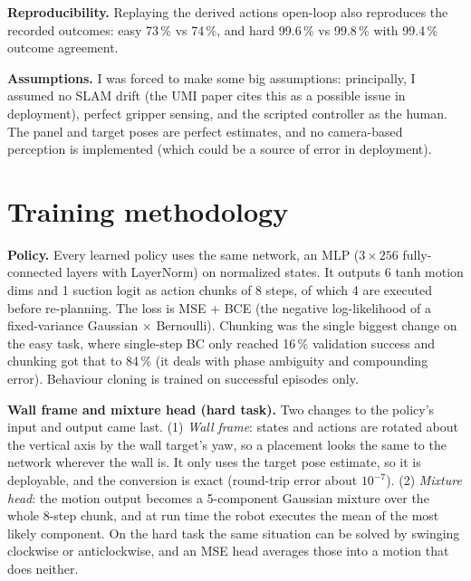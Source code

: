 \documentclass[10pt]{article}
\newcommand{\pct}{\,\%}
\newcommand{\para}[1]{\textbf{#1}}
\begin{document}
\para{Reproducibility.} Replaying the derived actions open-loop also reproduces the recorded outcomes: easy 73\pct{} vs 74\pct, and
hard 99.6\pct{} vs 99.8\pct{} with 99.4\pct{} outcome agreement.

\para{Assumptions.} I was forced to make some big assumptions: principally, I assumed no SLAM drift (the UMI paper cites this as a possible issue in deployment), perfect gripper sensing, and the scripted controller as the
human. The panel and target poses are perfect estimates, and no camera-based perception is implemented (which could be a source of error in deployment).

\section{Training methodology}

\para{Policy.} Every learned policy uses the same network, an MLP ($3 \times 256$ fully-connected layers with LayerNorm) on
normalized states. It outputs 6 tanh motion dims and 1 suction logit as action chunks of 8 steps, of
which 4 are executed before re-planning. The loss is MSE + BCE (the negative log-likelihood of a
fixed-variance Gaussian $\times$ Bernoulli). Chunking was the single biggest change on the easy task, where
single-step BC only reached 16\pct{} validation success and chunking got that to 84\pct{} (it deals with phase
ambiguity and compounding error). Behaviour cloning is trained on successful episodes only.

\para{Wall frame and mixture head (hard task).} Two changes to the policy's input and output came last. (1) \emph{Wall frame}: states and actions are rotated about the vertical axis by the wall target's yaw, so a placement looks the same to the network wherever the wall is. It only uses the target pose estimate, so it is deployable, and the conversion is exact (round-trip error about $10^{-7}$). (2) \emph{Mixture head}: the motion output becomes a 5-component Gaussian mixture over the whole 8-step chunk, and at run time the robot executes the mean of the most likely component. On the hard task the same situation can be solved by swinging clockwise or anticlockwise, and an MSE head averages those into a motion that does neither.
\end{document}

